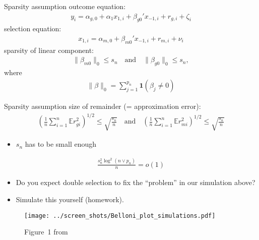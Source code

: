 \documentclass[xcolor=dvipsnames, handout]{beamer}
\newcommand{\E}{\mathbb{E}}
\begin{document}
\begin{frame}{Sparsity assumption}
outcome equation:
\begin{align*}
  y_i = \alpha_{g, 0} + \alpha_1 x_{1,i} + \beta_{g0}' x_{-1, i} + r_{g, i} + \zeta_i
\end{align*}
selection equation: 
\begin{align*}
  x_{1, i} = \alpha_{m, 0} + \beta_{m0}' x_{-1, i} + r_{m, i} + \nu_i
\end{align*}
sparsity of linear component: 
\begin{align*}
  \lVert \beta_{m0} \rVert_0 \leq s_n \quad \text{and} \quad \lVert \beta_{g0} \rVert_0 \leq s_n,
\end{align*}
where 
\begin{align*}
  \lVert \beta \rVert_0 = \sum_{j = 1}^{p_n} \mathbf{1}(\beta_j \neq 0)
\end{align*}
\end{frame}


\begin{frame}{Sparsity assumption}
size of remainder (= approximation error): 
\begin{align*}
  \left(\frac{1}{n} \sum_{i=1}^n \E{} r_{gi}^2\right)^{1/2} \leq \sqrt{\frac{s_n}{n}} 
  \quad \text{and} \quad 
  \left(\frac{1}{n} \sum_{i=1}^n \E{} r_{mi}^2\right)^{1/2} \leq \sqrt{\frac{s_n}{n}}
\end{align*}
\begin{itemize}
  \item $s_n$ has to be small enough
\end{itemize}
\begin{align*}
  \frac{s_n^2 \log^2 (n \vee p_n)}{n} = o(1) 
\end{align*}

\end{frame}


\begin{frame}
  \begin{itemize}
    \item Do you expect double selection to fix the ``problem'' in our simulation above?
    \item Simulate this yourself (homework). 
  \end{itemize}
\end{frame}

\begin{frame}
\begin{figure}
  \texttt{[image: ../screen\_shots/Belloni\_plot\_simulations.pdf]}
   \caption{Figure~1 from \textcite{belloni2014inference}}
\end{figure}
\end{frame}
\end{document}
